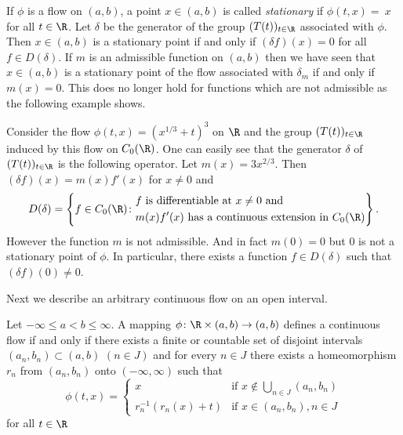 \begin{remark}\label{rem:b2-3.19}
%
If\/ $\phi$ is a flow on $(a,b)$, a point $x \in (a,b)$ is called \emph{stationary} if\/ $\phi(t,x) =~x$ for all $t \in \R$.
Let $\delta$ be the generator of the group $(T(t))_{t \in \R}$ associated with $\phi$.
Then $x \in (a,b)$ is a stationary point if and only if\/ $(\delta f)(x) = 0$ for all $f \in D(\delta)$.
If\/ $m$ is an admissible function on $(a,b)$ then we have seen that $x \in (a,b)$ is a stationary point of the flow associated with $\delta_{m}$ if and only if\/ $m(x) = 0$.
This does no longer hold for functions which are not admissible as the following example shows.
\end{remark}
\begin{example}\label{ex:b2-3.20}
%
Consider the flow $\phi(t,x) = (x^{1/3} + t)^{3}$ on $\R$ and the group $(T(t))_{t \in \R}$ induced by this flow on $C_{0}(\R)$.
One can easily see that the generator $\delta$ of\/ $(T(t))_{t \in \R}$ is the following operator.
Let $m(x) = 3x^{2/3}$.
Then $(\delta f)(x) = m(x)f'(x)$ for $x \neq 0$ and 
\begin{equation*}
D(\delta) = 
\left\{ f \in C_{0}(\R) \colon 
\begin{aligned}
	&f \text{ is differentiable at } x \neq 0 \text{ and } \\
	&m(x)f'(x) \text{ has a continuous extension in } C_{0}(\R)
\end{aligned}
\right\}.
\end{equation*}
However the function $m$ is not admissible.
And in fact $m(0) = 0$ but $0$ is not a stationary point of\/ $\phi$.
In particular, there exists a function $f \in D(\delta)$ such that $(\delta f)(0) \neq 0$.
\end{example}
Next we describe an arbitrary continuous flow on an open interval.
\begin{proposition}\label{prop:b2-3.21}
%
Let $-\infty \leq a < b \leq \infty$.
A mapping $\phi \colon \R \times (a,b) \to (a,b)$ defines a continuous flow if and only if there exists a finite or countable set of disjoint intervals $(a_{n},b_{n}) \subset (a,b)$ $(n \in J)$ and for every $n \in J$ there exists a homeomorphism $r_{n}$ from $(a_{n},b_{n})$ onto $(-\infty,\infty)$ such that
\begin{equation*}\label{eq:b2-flow}
\phi(t,x) = \begin{cases}
    x & \text{if } x \notin \bigcup_{n \in J} (a_{n},b_{n}) \\
    r_{n}^{-1}(r_{n}(x) + t) & \text{if } x \in (a_{n},b_{n}), n \in J
\end{cases}
\end{equation*}
for all $t \in \R$
\end{proposition}

